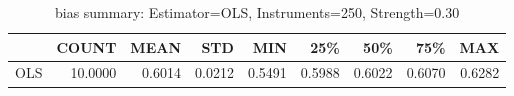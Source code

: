 \begin{table}[ht]
\centering
\caption{bias summary: Estimator=OLS, Instruments=250, Strength=0.30}
\begin{tabular}{lrrrrrrrr}
\toprule
 & COUNT & MEAN & STD & MIN & 25\% & 50\% & 75\% & MAX \\
\midrule
OLS & 10.0000 & 0.6014 & 0.0212 & 0.5491 & 0.5988 & 0.6022 & 0.6070 & 0.6282 \\
\bottomrule
\end{tabular}
\end{table}
